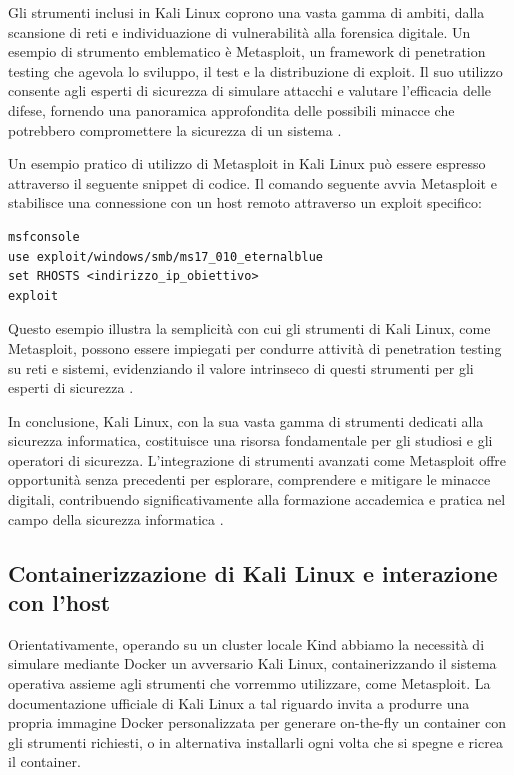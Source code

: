 Gli strumenti inclusi in Kali Linux coprono una vasta gamma di ambiti, dalla scansione di reti e individuazione di vulnerabilità alla forensica digitale. Un esempio di strumento emblematico è Metasploit, un framework di penetration testing che agevola lo sviluppo, il test e la distribuzione di exploit. Il suo utilizzo consente agli esperti di sicurezza di simulare attacchi e valutare l'efficacia delle difese, fornendo una panoramica approfondita delle possibili minacce che potrebbero compromettere la sicurezza di un sistema \cite{metasploit_paper}.

Un esempio pratico di utilizzo di Metasploit in Kali Linux può essere espresso attraverso il seguente snippet di codice. Il comando seguente avvia Metasploit e stabilisce una connessione con un host remoto attraverso un exploit specifico:

\begin{small}
\begin{Verbatim}[commandchars=\\\{\}]
msfconsole
use exploit/windows/smb/ms17_010_eternalblue
set RHOSTS <indirizzo_ip_obiettivo>
exploit
\end{Verbatim}
\end{small}

Questo esempio illustra la semplicità con cui gli strumenti di Kali Linux, come Metasploit, possono essere impiegati per condurre attività di penetration testing su reti e sistemi, evidenziando il valore intrinseco di questi strumenti per gli esperti di sicurezza \cite{kali_metasploit_integration}.

In conclusione, Kali Linux, con la sua vasta gamma di strumenti dedicati alla sicurezza informatica, costituisce una risorsa fondamentale per gli studiosi e gli operatori di sicurezza. L'integrazione di strumenti avanzati come Metasploit offre opportunità senza precedenti per esplorare, comprendere e mitigare le minacce digitali, contribuendo significativamente alla formazione accademica e pratica nel campo della sicurezza informatica \cite{kali_linux_education}.

\subsection{Containerizzazione di Kali Linux e interazione con l'host}

Orientativamente, operando su un cluster locale Kind abbiamo la necessità di simulare mediante Docker un avversario Kali Linux, containerizzando il sistema operativa assieme agli strumenti che vorremmo utilizzare, come Metasploit. La documentazione ufficiale di Kali Linux a tal riguardo invita a produrre una propria immagine Docker personalizzata per generare on-the-fly un container con gli strumenti richiesti, o in alternativa installarli ogni volta che si spegne e ricrea il container.

